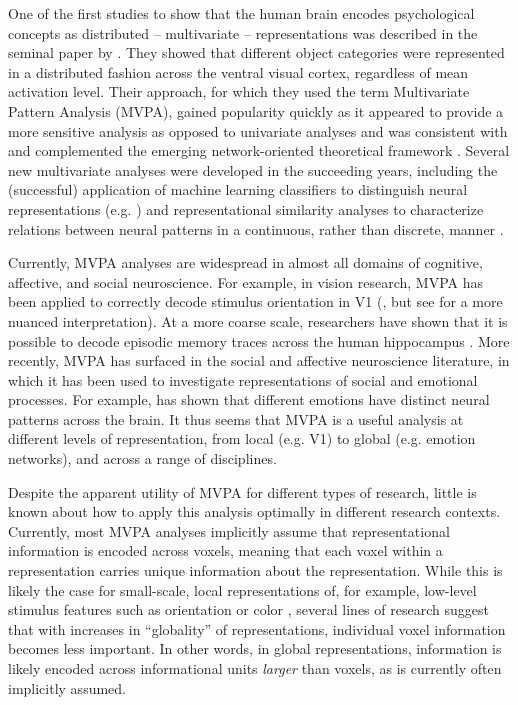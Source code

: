 \documentclass[12pt,a4paper]{article}\usepackage[]{graphicx}\usepackage[]{color}
\begin{document}
One of the first studies to show that the human brain encodes psychological concepts as distributed -- multivariate -- representations was described in the seminal paper by \cite{haxby2001}. They showed that different object categories were represented in a distributed fashion across the ventral visual cortex, regardless of mean activation level. Their approach, for which they used the term Multivariate Pattern Analysis (MVPA), gained popularity quickly as it appeared to provide a more sensitive analysis as opposed to univariate analyses \citep{norman2006,mahmoudi2012} and was consistent with and complemented the emerging network-oriented theoretical framework \citep{bressler2010}. Several new multivariate analyses were developed in the succeeding years, including the (successful) application of machine learning classifiers to distinguish neural representations (e.g. \citealp{cox2003}) and representational similarity analyses to characterize relations between neural patterns in a continuous, rather than discrete, manner \citep{kriegeskorte2008}. 

Currently, MVPA analyses are widespread in almost all domains of cognitive, affective, and social neuroscience. For example, in vision research, MVPA has been applied to correctly decode stimulus orientation in V1 (\citealp{kamitani2005}, but see \citealp{opdebeeck2010} for a more nuanced interpretation). At a more coarse scale, researchers have shown that it is possible to decode episodic memory traces across the human hippocampus \citep{chadwick2010}. More recently, MVPA has surfaced in the social and affective neuroscience literature, in which it has been used to investigate representations of social and emotional processes. For example, \cite{kassam2013} has shown that different emotions have distinct neural patterns across the brain. It thus seems that MVPA is a useful analysis at different levels of representation, from local (e.g. V1) to global (e.g. emotion networks), and across a range of disciplines.     

Despite the apparent utility of MVPA for different types of research, little is known about how to apply this analysis optimally in different research contexts. Currently, most MVPA analyses implicitly assume that representational information is encoded across voxels, meaning that each voxel within a representation carries unique information about the representation. While this is likely the case for small-scale, local representations of, for example, low-level stimulus features such as orientation \cite{kamitani2005} or color \citep{brouwer2009}, several lines of research suggest that with increases in ``globality'' of representations, individual voxel information becomes less important. In other words, in global representations, information is likely encoded across informational units \emph{larger} than voxels, as is currently often implicitly assumed. 
\end{document}
